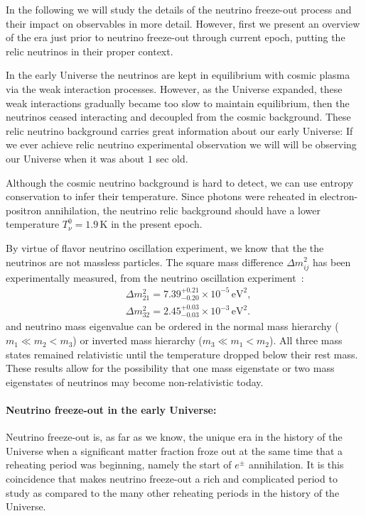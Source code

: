 In the following we will study the details of the neutrino freeze-out process and their impact on observables in more detail. However, first we present an overview of the era just prior to neutrino freeze-out through current epoch, putting the relic neutrinos in their proper context.

In the early Universe the neutrinos are kept in equilibrium with cosmic plasma via the weak interaction processes. However, as the Universe expanded, these weak interactions gradually became too slow to maintain equilibrium, then the neutrinos ceased interacting and decoupled from the cosmic background. These relic neutrino background carries great information about our early Universe: If we ever achieve relic neutrino experimental observation we will will be observing our Universe when it was about $1$ sec old. 

Although the cosmic neutrino background is hard to detect, we can use entropy conservation to infer their temperature. Since photons were reheated in electron-positron annihilation, the neutrino relic background  should have a lower  temperature $T_\nu^0=1.9\,\mathrm{K}$ in the present epoch.

By virtue of flavor  neutrino oscillation experiment, we know that the the neutrinos are not massless particles.  The square mass difference $\Delta m^2_{ij}$ has been experimentally measured, from the neutrino oscillation experiment~\cite{ParticleDataGroup:2022pth}:
\begin{align}
&\Delta{m}_{21}^2=7.39^{+0.21}_{-0.20}\times10^{-5}\,\mathrm{eV}^2,\\
&\Delta{m}_{32}^2=2.45^{+0.03}_{-0.03}\times10^{-3}\,\mathrm{eV}^2.
\end{align}
and neutrino mass eigenvalue can be ordered in the normal mass hierarchy ($m_1\ll m_2<m_3$) or inverted mass hierarchy ($m_3\ll m_1<m_2$). All three mass states remained relativistic until the temperature dropped below their rest mass. These results allow for the possibility that one mass eigenstate or two mass eigenstates of neutrinos may become non-relativistic today. 


\paragraph{Neutrino freeze-out in the early Universe:}
Neutrino freeze-out is, as far as we know, the unique era in the history of the Universe when a significant matter fraction froze out at the same time that a reheating period was beginning, namely the start of $e^\pm$ annihilation. It is this coincidence that makes neutrino freeze-out a rich and complicated period to study as compared to the many other reheating periods in the history of the Universe. 

